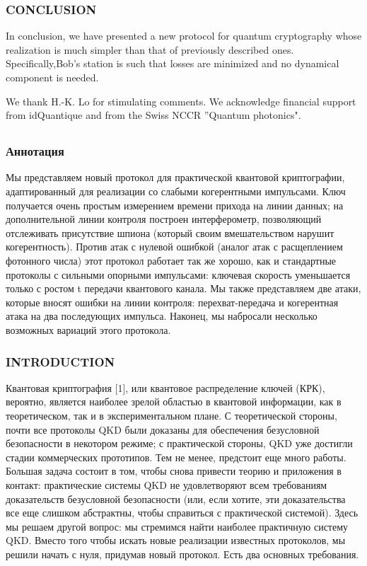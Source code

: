 \subsubsection{CONCLUSION}

In conclusion, we have presented a new protocol for quantum cryptography whose realization is much simpler than that of previously described ones. Specifically,Bob’s station is such that losses are minimized and no dynamical component is needed.

We thank H.-K. Lo for stimulating comments. We acknowledge financial support from idQuantique and from the Swiss NCCR ”Quantum photonics".

\subsection{\trnas}

\subsubsection*{Аннотация}

Мы представляем новый протокол для практической квантовой криптографии, адаптированный для реализации со слабыми когерентными импульсами. Ключ получается очень простым измерением времени прихода на линии данных; на дополнительной линии контроля построен интерферометр, позволяющий отслеживать присутствие шпиона (который своим вмешательством нарушит когерентность). Против атак с нулевой ошибкой (аналог атак с расщеплением фотонного числа) этот протокол работает так же хорошо, как и стандартные протоколы с сильными опорными импульсами: ключевая скорость уменьшается только с ростом t передачи квантового канала. Мы также представляем две атаки, которые вносят ошибки на линии контроля: перехват-передача и когерентная атака на два последующих импульса. Наконец, мы набросали несколько возможных вариаций этого протокола.

\subsubsection{INTRODUCTION}

Квантовая криптография [1], или квантовое распределение ключей (КРК), вероятно, является наиболее зрелой областью в квантовой информации, как в теоретическом, так и в экспериментальном плане. С теоретической стороны, почти все протоколы QKD были доказаны для обеспечения безусловной безопасности в некотором режиме; с практической стороны, QKD уже достигли стадии коммерческих прототипов. Тем не менее, предстоит еще много работы. Большая задача состоит в том, чтобы снова привести теорию и приложения в контакт: практические системы QKD не удовлетворяют всем требованиям доказательств безусловной безопасности (или, если хотите, эти доказательства все еще слишком абстрактны, чтобы справиться с практической системой). Здесь мы решаем другой вопрос: мы стремимся найти наиболее практичную систему QKD. Вместо того чтобы искать новые реализации известных протоколов, мы решили начать с нуля, придумав новый протокол. Есть два основных требования.


